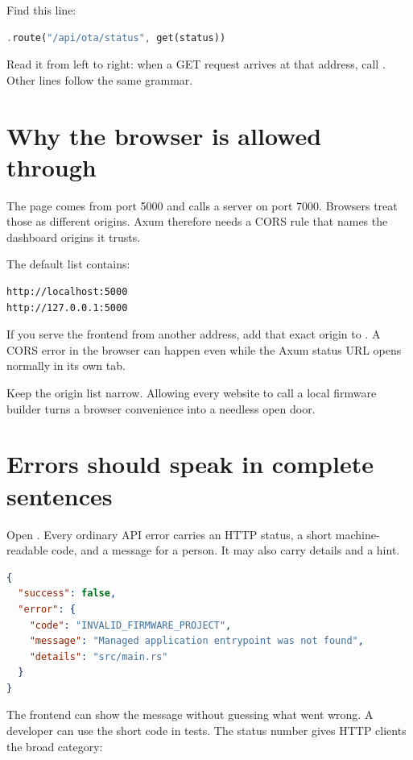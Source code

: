 Find this line:

\begin{lstlisting}[language=Rust,numbers=none]
.route("/api/ota/status", get(status))
\end{lstlisting}

Read it from left to right: when a GET request arrives at that address, call . Other lines follow the same grammar.

\section{Why the browser is allowed through}

The page comes from port 5000 and calls a server on port 7000. Browsers treat those as different origins. Axum therefore needs a CORS rule that names the dashboard origins it trusts.

The default list contains:

\begin{lstlisting}[numbers=none]
http://localhost:5000
http://127.0.0.1:5000
\end{lstlisting}

If you serve the frontend from another address, add that exact origin to . A CORS error in the browser can happen even while the Axum status URL opens normally in its own tab.

\begin{warningbox}
Keep the origin list narrow. Allowing every website to call a local firmware builder turns a browser convenience into a needless open door.
\end{warningbox}

\section{Errors should speak in complete sentences}

Open . Every ordinary API error carries an HTTP status, a short machine-readable code, and a message for a person. It may also carry details and a hint.

\begin{lstlisting}[language=JSON,numbers=none]
{
  "success": false,
  "error": {
    "code": "INVALID_FIRMWARE_PROJECT",
    "message": "Managed application entrypoint was not found",
    "details": "src/main.rs"
  }
}
\end{lstlisting}

The frontend can show the message without guessing what went wrong. A developer can use the short code in tests. The status number gives HTTP clients the broad category:

